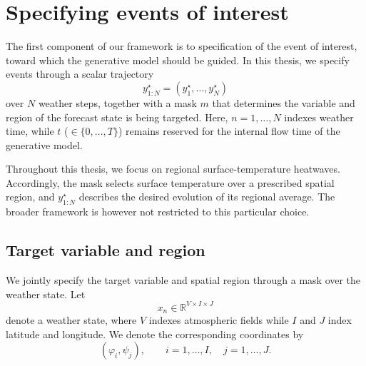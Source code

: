 
\chapter{Specifying events of interest}
\label{ch:specify}

The first component of our framework is to specification of the event of interest, toward which the
generative model should be guided.
In this thesis, we specify events through a scalar trajectory
\[
    y^\star_{1:N}
    =
    \left(
        y^\star_1,\ldots,y^\star_N
    \right)
\]
over \(N\) weather steps, together with a mask \(m\) that determines the variable and region of the forecast state is being targeted.
Here, \(n=1,\ldots,N\) indexes weather time, while \(t\) ($\in \{0,...,T\}$) remains reserved for
the internal flow time of the generative model.

Throughout this thesis, we focus on regional surface-temperature heatwaves.
Accordingly, the mask selects surface temperature over a prescribed spatial
region, and \(y^\star_{1:N}\) describes the desired evolution of its regional
average.
The broader framework is however not restricted to this particular choice.




\section{Target variable and region}

We jointly specify the target variable and spatial region through a mask over
the weather state.
Let
\[
    x_n \in \mathbb{R}^{V\times I\times J}
\]
denote a weather state, where \(V\) indexes atmospheric fields while
\(I\) and \(J\) index latitude and longitude.
We denote the corresponding coordinates by
\[
    (\varphi_i,\psi_j),
    \qquad
    i=1,\ldots,I,
    \quad
    j=1,\ldots,J.
\]

